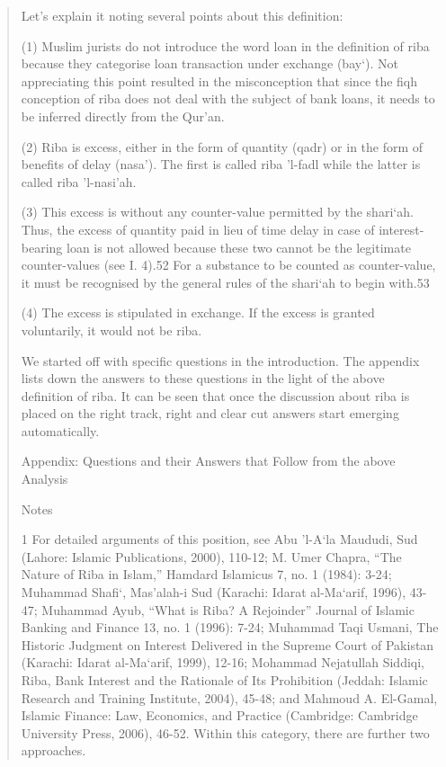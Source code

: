 \begin{quote}
Let's explain it noting several points about this definition:

(1) Muslim jurists do not introduce the word loan in the definition of riba because they categorise loan transaction under exchange (bay‘). Not appreciating this point resulted in the misconception that since the fiqh conception of riba does not deal with the subject of bank loans, it needs to be inferred directly from the Qur'an.

(2) Riba is excess, either in the form of quantity (qadr) or in the form of benefits of delay (nasa'). The first is called riba 'l-fadl while the latter is called riba 'l-nasi'ah.

(3) This excess is without any counter-value permitted by the shari‘ah. Thus, the excess of quantity paid in lieu of time delay in case of interest-bearing loan is not allowed because these two cannot be the legitimate counter-values (see I. 4).52 For a substance to be counted as counter-value, it must be recognised by the general rules of the shari‘ah to begin with.53

(4) The excess is stipulated in exchange. If the excess is granted voluntarily, it would not be riba.

We started off with specific questions in the introduction. The appendix lists down the answers to these questions in the light of the above definition of riba. It can be seen that once the discussion about riba is placed on the right track, right and clear cut answers start emerging automatically.

Appendix: Questions and their Answers that Follow from the above Analysis

Notes

1 For detailed arguments of this position, see Abu 'l-A‘la Maududi, Sud (Lahore: Islamic Publications, 2000), 110-12; M. Umer Chapra, “The Nature of Riba in Islam,” Hamdard Islamicus 7, no. 1 (1984): 3-24; Muhammad Shafi‘, Mas'alah-i Sud (Karachi: Idarat al-Ma‘arif, 1996), 43-47; Muhammad Ayub, “What is Riba? A Rejoinder” Journal of Islamic Banking and Finance 13, no. 1 (1996): 7-24; Muhammad Taqi Usmani, The Historic Judgment on Interest Delivered in the Supreme Court of Pakistan (Karachi: Idarat al-Ma‘arif, 1999), 12-16; Mohammad Nejatullah Siddiqi, Riba, Bank Interest and the Rationale of Its Prohibition (Jeddah: Islamic Research and Training Institute, 2004), 45-48; and Mahmoud A. El-Gamal, Islamic Finance: Law, Economics, and Practice (Cambridge: Cambridge University Press, 2006), 46-52. Within this category, there are further two approaches.


\end{quote}
